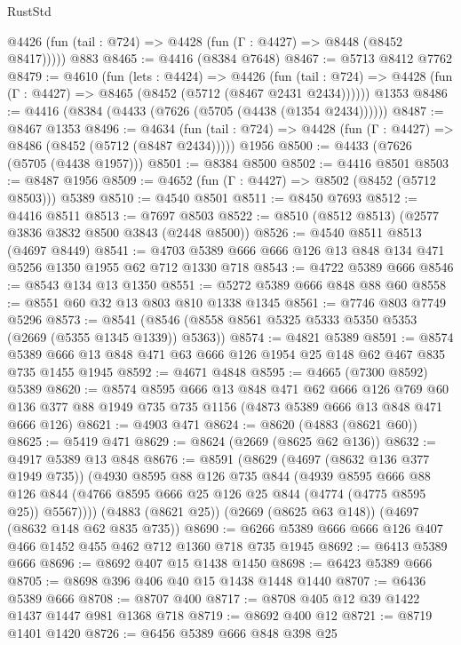 \begin{lexlean}{RustStd}
\begin{coremodule}
      @4426 (fun (tail : @724) => @4428 (fun (Γ : @4427) => @8448 (@8452 @8417)))))
    @883
@8465 := @4416 (@8384 @7648)
@8467 := @5713 @8412 @7762
@8479 := @4610
    (fun (lets : @4424) =>
    @4426
      (fun (tail : @724) => @4428 (fun (Γ : @4427) => @8465 (@8452 (@5712 (@8467 @2431 @2434))))))
    @1353
@8486 := @4416 (@8384 (@4433 (@7626 (@5705 (@4438 (@1354 @2434))))))
@8487 := @8467 @1353
@8496 := @4634
    (fun (tail : @724) => @4428 (fun (Γ : @4427) => @8486 (@8452 (@5712 (@8487 @2434)))))
    @1956
@8500 := @4433 (@7626 (@5705 (@4438 @1957)))
@8501 := @8384 @8500
@8502 := @4416 @8501
@8503 := @8487 @1956
@8509 := @4652 (fun (Γ : @4427) => @8502 (@8452 (@5712 @8503))) @5389
@8510 := @4540 @8501
@8511 := @8450 @7693
@8512 := @4416 @8511
@8513 := @7697 @8503
@8522 := @8510 (@8512 @8513) (@2577 @3836 @3832 @8500 @3843 (@2448 @8500))
@8526 := @4540 @8511 @8513 (@4697 @8449)
@8541 := @4703 @5389 @666 @666 @126 @13 @848 @134 @471 @5256 @1350 @1955 @62 @712 @1330 @718
@8543 := @4722 @5389 @666
@8546 := @8543 @134 @13 @1350
@8551 := @5272 @5389 @666 @848 @88 @60
@8558 := @8551 @60 @32 @13 @803 @810 @1338 @1345
@8561 := @7746 @803 @7749 @5296
@8573 := @8541 (@8546 (@8558 @8561 @5325 @5333 @5350 @5353 (@2669 (@5355 @1345 @1339)) @5363))
@8574 := @4821 @5389
@8591 := @8574 @5389 @666 @13 @848 @471 @63 @666 @126 @1954 @25 @148 @62 @467 @835 @735 @1455 @1945
@8592 := @4671 @4848
@8595 := @4665 (@7300 @8592) @5389
@8620 := @8574
    @8595
    @666
    @13
    @848
    @471
    @62
    @666
    @126
    @769
    @60
    @136
    @377
    @88
    @1949
    @735
    @735
    @1156
    (@4873 @5389 @666 @13 @848 @471 @666 @126)
@8621 := @4903 @471
@8624 := @8620 (@4883 (@8621 @60))
@8625 := @5419 @471
@8629 := @8624 (@2669 (@8625 @62 @136))
@8632 := @4917 @5389 @13 @848
@8676 := @8591
    (@8629
      (@4697 (@8632 @136 @377 @1949 @735))
      (@4930
        @8595
        @88
        @126
        @735
        @844
        (@4939
          @8595
          @666
          @88
          @126
          @844
          (@4766 @8595 @666 @25 @126 @25 @844 (@4774 (@4775 @8595 @25)) @5567))))
    (@4883 (@8621 @25))
    (@2669 (@8625 @63 @148))
    (@4697 (@8632 @148 @62 @835 @735))
@8690 := @6266 @5389 @666 @666 @126 @407 @466 @1452 @455 @462 @712 @1360 @718 @735 @1945
@8692 := @6413 @5389 @666
@8696 := @8692 @407 @15 @1438 @1450
@8698 := @6423 @5389 @666
@8705 := @8698 @396 @406 @40 @15 @1438 @1448 @1440
@8707 := @6436 @5389 @666
@8708 := @8707 @400
@8717 := @8708 @405 @12 @39 @1422 @1437 @1447 @981 @1368 @718
@8719 := @8692 @400 @12
@8721 := @8719 @1401 @1420
@8726 := @6456 @5389 @666 @848 @398 @25

\end{coremodule}
\end{lexlean}
